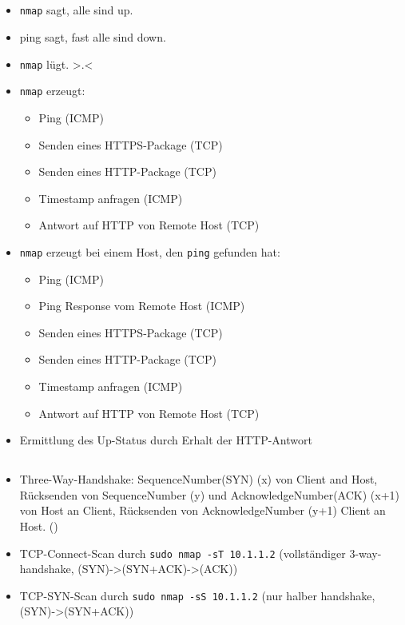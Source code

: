 \documentclass[twoside]{article}
\newcommand{\ttt}[1]{%
	\texttt{#1}%
}
\begin{document}
\subsection{}
\begin{itemize}
	\item \ttt{nmap} sagt, alle sind up.
	\item ping sagt, fast alle sind down.
	\item \ttt{nmap} lügt. >.<
	\item \ttt{nmap} erzeugt:
		\begin{itemize}
			\item Ping (ICMP)
			\item Senden eines HTTPS-Package (TCP)
			\item Senden eines HTTP-Package (TCP)
			\item Timestamp anfragen (ICMP)
			\item Antwort auf HTTP von Remote Host (TCP)
		\end{itemize}
	\item \ttt{nmap} erzeugt bei einem Host, den \ttt{ping} gefunden hat:
		\begin{itemize}
			\item Ping (ICMP)
			\item Ping Response vom Remote Host (ICMP)
			\item Senden eines HTTPS-Package (TCP)
			\item Senden eines HTTP-Package (TCP)
			\item Timestamp anfragen (ICMP)
			\item Antwort auf HTTP von Remote Host (TCP)
		\end{itemize}
	\item Ermittlung des Up-Status durch Erhalt der HTTP-Antwort
\end{itemize}
\subsection{}
\begin{itemize}
	\item Three-Way-Handshake: SequenceNumber(SYN) (x) von Client and Host, Rücksenden von SequenceNumber (y) und AcknowledgeNumber(ACK) (x+1) von Host an Client, Rücksenden von AcknowledgeNumber (y+1) Client an Host. (\cite{wiki3})
	\item TCP-Connect-Scan durch \ttt{sudo nmap -sT 10.1.1.2} (vollständiger 3-way-handshake, (SYN)->(SYN+ACK)->(ACK))
	\item TCP-SYN-Scan durch \ttt{sudo nmap -sS 10.1.1.2} (nur halber handshake, (SYN)->(SYN+ACK))
\end{itemize}
\end{document}
